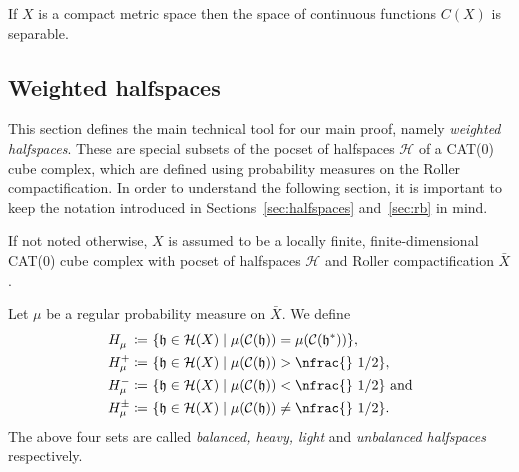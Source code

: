 \begin{lemma}
  \label{lem:continuous-separable}
  If \(X\) is a compact metric space then the space of continuous functions \(C(X)\) is separable.
\end{lemma}

\subsection{Weighted halfspaces}
\label{sec:weight}

This section defines the main technical tool for our main proof, namely \emph{weighted halfspaces}. These are special subsets of the pocset of halfspaces \(\mathcal{H}\) of a CAT(0) cube complex, which are defined using probability measures on the Roller compactification. In order to understand the following section, it is important to keep the notation introduced in Sections~\ref{sec:halfspaces} and~\ref{sec:rb} in mind.

If not noted otherwise, \(X\) is assumed to be a locally finite, finite-dimensional CAT(0) cube complex with pocset of halfspaces \(\mathcal{H}\) and Roller compactification \(\bar X\).

\begin{defin}
  Let \(\mu\) be a regular probability measure on \(\bar X\). We define
  \begin{align*}
    H_\mu^{\phantom{+}} \coloneqq &\ \{\mathfrak{h} \in \mathcal{H}(X) \mid \mu(\mathcal{C}(\mathfrak{h})) = \mu(\mathcal{C}(\mathfrak{h}^\ast))\},\\
    H_\mu^+ \coloneqq &\ \{\mathfrak{h} \in \mathcal{H}(X) \mid \mu(\mathcal{C}(\mathfrak{h})) > \text{\nfrac{} 1/2} \},\\
    H_\mu^- \coloneqq &\ \{\mathfrak{h} \in \mathcal{H}(X) \mid \mu(\mathcal{C}(\mathfrak{h})) < \text{\nfrac{} 1/2}\} \text{ and}\\
    H_\mu^\pm \coloneqq &\ \{\mathfrak{h} \in \mathcal{H}(X) \mid \mu(\mathcal{C}(\mathfrak{h})) \neq \text{\nfrac{} 1/2}\}.
  \end{align*} 
  The above four sets are called \emph{balanced, heavy, light} and \emph{unbalanced halfspaces} respectively.
\end{defin}

